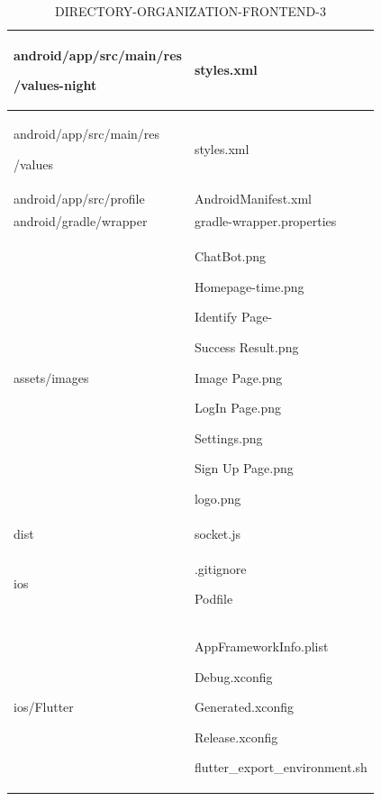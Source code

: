 \documentclass[conference]{IEEEtran}
\begin{document}
\newpage 
\begin{table}[h]
\caption{DIRECTORY-ORGANIZATION-FRONTEND-3}
\def\arraystretch{1.24} \small
    \begin{tabular}{|p{3.7cm}|p{4.1cm}|}
\hline
          
          android/app/src/main/res  \par /values-night \par   & \par styles.xml
          \\ \hline

          android/app/src/main/res  \par /values \par   & \par styles.xml
          \\ \hline
          
          android/app/src/profile \par   & \par AndroidManifest.xml
          \\ \hline

          android/gradle/wrapper \par   & \par gradle-wrapper.properties
          \\ \hline

          assets/images \par   & \par ChatBot.png \par Homepage-time.png \par Identify Page- \par Success Result.png  \par Image Page.png \par LogIn Page.png \par Settings.png \par Sign Up Page.png \par logo.png  
          \\ \hline
          
          dist   & \par socket.js
          \\ \hline

          ios \par   & \par .gitignore \par Podfile
          \\ \hline

          ios/Flutter \par   & \par AppFrameworkInfo.plist \par Debug.xconfig \par Generated.xconfig  \par Release.xconfig \par flutter\_export\_environment.sh
          \\ \hline


\end{tabular}
\end{table}
\end{document}
